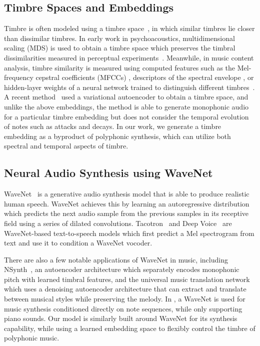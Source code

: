 \subsection{Timbre Spaces and Embeddings}

Timbre is often modeled using a timbre space~\cite{peeters2011timbre}, in which similar timbres lie closer than dissimilar timbres.
In early work in psychoacoustics, multidimensional scaling (MDS) is used to obtain a timbre space which preserves the timbral dissimilarities measured in perceptual experiments~\cite{grey1977multidimensional,wessel1979timbre}.
Meanwhile, in music content analysis, timbre similarity is measured using computed features such as the Mel-frequency cepstral coefficients (MFCCs) \cite{logan2000mfcc},
descriptors of the spectral envelope \cite{agostini2013aid}, or hidden-layer weights of a neural network trained to distinguish different timbres~\cite{humphrey2011nlse}.
A recent method~\cite{esling2018timbre} used a variational autoencoder \cite{kingma2014vae} to obtain a timbre space, and unlike the above embeddings, the method is able to generate monophonic audio for a particular timbre embedding but does not consider the temporal evolution of notes such as attacks and decays.
In our work, we generate a timbre embedding as a byproduct of polyphonic synthesis, which can utilize both spectral and temporal aspects of timbre.


\subsection{Neural Audio Synthesis using WaveNet}

WaveNet~\cite{oord2016wavenet} is a generative audio synthesis model that is able to produce realistic human speech.
WaveNet achieves this by learning an autoregressive distribution which predicts the next audio sample from the previous samples in its receptive field using a series of dilated convolutions.
Tacotron~\cite{shen2018tacotron} and Deep Voice~\cite{ping2018deepvoice3} are WaveNet-based text-to-speech models which first predict a Mel spectrogram from text and use it to condition a WaveNet vocoder.

There are also a few notable applications of WaveNet in music, including NSynth~\cite{engel2017nsynth}, an autoencoder architecture which separately encodes monophonic pitch with learned timbral features, and the universal music translation network~\cite{mor2019universal} which uses a denoising autoencoder architecture that can extract and translate between musical styles while preserving the melody.
In \cite{hawthorne2019maestro}, a WaveNet is used for music synthesis conditioned directly on note sequences, while only supporting piano sounds.
Our model is similarly built around WaveNet for its synthesis capability, while using a learned embedding space to flexibly control the timbre of polyphonic music.

